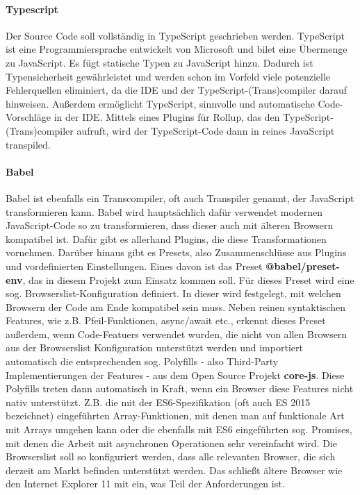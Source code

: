 
\paragraph{Typescript} Der Source Code soll vollständig in TypeScript geschrieben werden. TypeScript ist eine Programmiersprache entwickelt von Microsoft und bilet eine Übermenge zu JavaScript. Es fügt statische Typen zu JavaScript hinzu. Dadurch ist Typensicherheit gewährleistet und werden schon im Vorfeld viele potenzielle Fehlerquellen eliminiert, da die IDE und der TypeScript-(Trans)compiler darauf hinweisen. Außerdem ermöglicht TypeScript, sinnvolle und automatische Code-Vorschläge in der IDE. 
Mittels eines Plugins für Rollup, das den TypeScript-(Trans)compiler aufruft, wird der TypeScript-Code dann in reines JavaScript transpiled. 

\paragraph{Babel} Babel ist ebenfalls ein Transcompiler, oft auch Transpiler genannt, der JavaScript transformieren kann. Babel wird hauptsächlich dafür verwendet modernen JavaScript-Code so zu transformieren, dass dieser auch mit älteren Browsern kompatibel ist. Dafür gibt es allerhand Plugins, die diese Transformationen vornehmen. Darüber hinaus gibt es Presets, also Zusammenschlüsse aus Plugins und vordefinierten Einstellungen. Eines davon ist das Preset \textbf{@babel/preset-env}, das in diesem Projekt zum Einsatz kommen soll. Für dieses Preset wird eine sog. Browserslist-Konfiguration definiert. In dieser wird festgelegt, mit welchen Browsern der Code am Ende kompatibel sein muss. Neben reinen syntaktischen Features, wie z.B. Pfeil-Funktionen, async/await etc., erkennt dieses Preset außerdem, wenn Code-Featuers verwendet wurden, die nicht von allen Browsern aus der Browserslist Konfiguration unterstützt werden und importiert automatisch die entsprechenden sog. Polyfills - also Third-Party Implementierungen der Features - aus dem Open Source Projekt \textbf{core-js}. Diese Polyfills treten dann automatisch in Kraft, wenn ein Browser diese Features nicht nativ unterstützt. Z.B. die mit der ES6-Spezifikation (oft auch ES 2015 bezeichnet) eingeführten Array-Funktionen, mit denen man auf funktionale Art mit Arrays umgehen kann oder die ebenfalls mit ES6 eingeführten sog. Promises, mit denen die Arbeit mit asynchronen Operationen sehr vereinfacht wird. Die Browserslist soll so konfiguriert werden, dass alle relevanten Browser, die sich derzeit am Markt befinden unterstützt werden. Das schließt ältere Browser wie den Internet Explorer 11 mit ein, was Teil der Anforderungen ist. 

